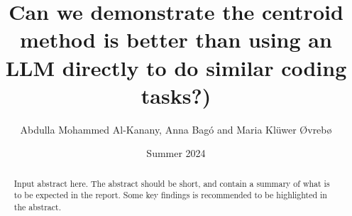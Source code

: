 \documentclass[a4paper]{article}
\begin{document}
\title{Can we demonstrate the centroid method is better than using an LLM directly to do similar coding tasks?)}
\author{Abdulla Mohammed Al-Kanany, Anna Bagó
and Maria Klüwer Øvrebø}
\date{Summer 2024}
\maketitle

\begin{abstract}
    Input abstract here. The abstract should be short, and contain a summary of what is to be expected in the report. Some key findings is recommended to be highlighted in the abstract.
\end{abstract}







\end{document}
